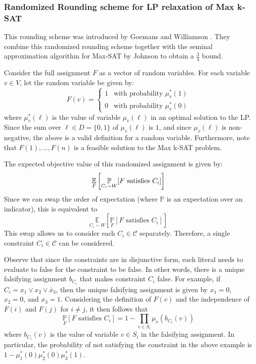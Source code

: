 \subsubsection{Randomized Rounding scheme for LP relaxation of Max k-SAT}
This rounding scheme was introduced by Goemans and Williamson \cite{GoeWil94}. They combine this randomized rounding scheme together with the seminal approximation algorithm for Max-SAT by Johnson \cite{Joh73} to obtain a $\frac{3}{4}$ bound.
 
Consider the full assignment $F$ as a vector of random variables. For each variable $v \in V$, let the random variable be given by:
\[
	F(v) = \begin{cases}
	1 & \text{with probability } \mu^*_v(1)\\
	0 & \text{with probability } \mu^*_v(0)
	\end{cases}
\]
where $\mu^*_v(\ell)$ is the value of variable $\mu_v(\ell)$ in an optimal solution to the LP.
Since the sum over $\ell \in D = \{0,1\}$ of  $\mu_v(\ell)$ is $1$, and since $\mu_v(\ell)$ is non-negative, the above is a valid definition for a random variable. 
Furthermore, note that $F(1), \dots, F(n)$ is a feasible solution to the Max k-SAT problem.

The expected objective value of this randomized assignment is given by:
\[
	\underset{F}{\mathbb{E}}\left[ \underset{C_i \sim W}{\mathbb{P}}[ F \text{ satisfies } C_i] \right]
\]
Since we can swap the order of expectation (where $\mathbb{P}$ is an expectation over an indicator), this is equivalent to
\[
\underset{C_i \sim W}{\mathbb{E}}\left[ \underset{F}{\mathbb{P}}[ F \text{ satisfies } C_i] \right]
\]
This swap allows us to consider each $C_i \in \mathcal{C}$ separately. 
Therefore, a single constraint $C_i \in \mathcal{C}$ can be considered.

Observe that since the constraints are in disjunctive form, each literal needs to evaluate to false for the constraint to be false. 
In other words, there is a unique falsifying assignment $b_{C_i}$ that makes constraint $C_i$ false. 
For example, if $C_i = x_1 \vee x_2 \vee \bar{x}_3$, then the unique falsifying assignment is given by $x_1 = 0$, $x_2 = 0$, and $x_3 = 1$. 
Considering the definition of $F(v)$ and the independence of $F(i)$ and $F(j)$ for $i \neq j$, it then follows that 
\begin{equation}
		\underset{F}{\mathbb{P}}[ F \text{ satisfies } C_i] = 1 - \prod_{v \in S_i} \mu_v(b_{C_i}(v)) \label{eq:objectiveRounding}
\end{equation}
where $b_{C_i}(v)$ is the value of variable $v \in S_i$ in the falsifying assignment. 
In particular, the probability of not satisfying the constraint in the above example is $ 1- \mu_1^*(0) \mu_2^*(0) \mu_3^*(1)$.

